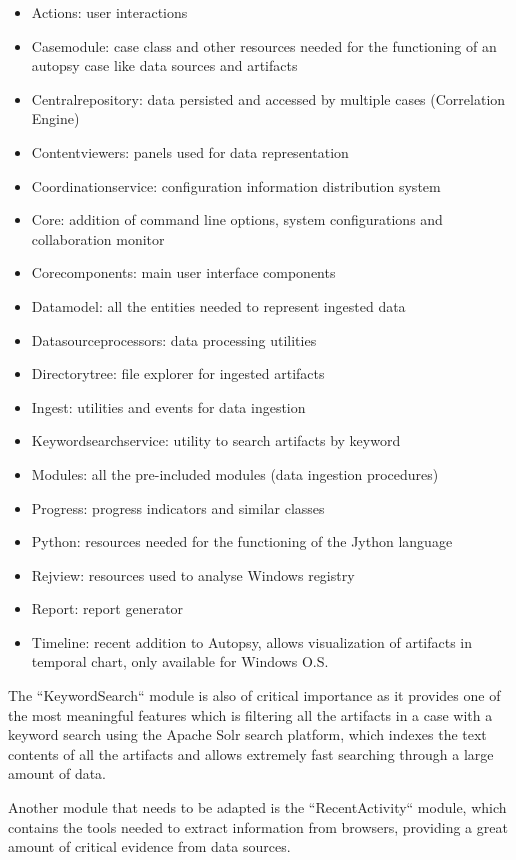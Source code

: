 \begin{itemize}
 \item Actions: user interactions 
 \item Casemodule: case class and other resources needed for the functioning of an autopsy case like data sources and artifacts
 \item Centralrepository: data persisted and accessed by multiple cases (Correlation Engine)
 \item Contentviewers: panels used for data representation 
 \item Coordinationservice: configuration information distribution system
 \item Core: addition of command line options, system configurations and collaboration monitor 
 \item Corecomponents: main user interface components
 \item Datamodel: all the entities needed to represent ingested data
 \item Datasourceprocessors: data processing utilities 
 \item Directorytree: file explorer for ingested artifacts
 \item Ingest: utilities and events for data ingestion 
 \item Keywordsearchservice: utility to search artifacts by keyword 
 \item Modules: all the pre-included modules (data ingestion procedures)
 \item Progress: progress indicators and similar classes
 \item Python: resources needed for the functioning of the Jython language
 \item Rejview: resources used to analyse Windows registry
 \item Report: report generator
 \item Timeline: recent addition to Autopsy, allows visualization of artifacts in temporal chart, only available for Windows O.S.
\end{itemize}

The ``KeywordSearch`` module is also of critical importance as it provides one of the most meaningful features which is filtering all the artifacts in a case with a keyword
search using the Apache Solr search platform, which indexes the text contents of all the artifacts and allows extremely fast searching through a large amount of data.  

Another module that needs to be adapted is the ``RecentActivity`` module, which contains the tools needed to extract information from browsers, providing a great amount of
critical evidence from data sources.

